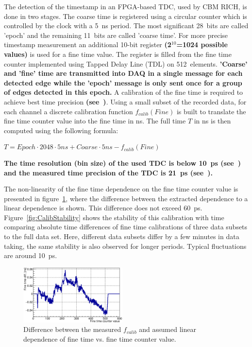 \documentclass[final,5p,times,twocolumn]{elsarticle}
\begin{document}
The detection of the timestamp in an FPGA-based TDC, used by CBM RICH, is done in two stages. The coarse time is registered using a circular counter which is controlled by the clock with a 5~ns period. The most significant 28~bits are called 'epoch' and the remaining 11~bits are called 'coarse time'. For more precise timestamp measurement an additional 10-bit register \textbf{(2$^{10}$=1024 possible values)} is used for a fine time value. The register is filled from the fine time counter implemented using Tapped Delay Line (TDL) on 512~elements.
\textbf{'Coarse' and 'fine' time are transmitted into DAQ in a single message for each detected edge while the 'epoch' message is only sent once for a group of edges detected in this epoch.}
A calibration of the fine time is required to achieve best time precision \textbf{(see~\cite{FINECALIB})}. Using a small subset of the recorded data, for each channel a discrete calibration function $ f_{calib}(Fine) $ is built to translate the fine time counter value into the fine time in ns. The full time $ T $ in ns is then computed using the following formula:

{\centering
$ T = Epoch \cdot 2048 \cdot 5ns + Coarse \cdot 5ns - f_{calib}(Fine) $ \\
}

\textbf{The time resolution (bin size) of the used TDC is below 10~ps (see~\cite{TDC}) and the measured time precision of the TDC is 21~ps (see~\cite{PEPAN}).}

The non-linearity of the fine time dependence on the fine time counter value is presented in figure~\ref{fig:CalibTableMinusLinear}, where the difference between the extracted dependence to a linear dependence is shown. This difference does not exceed 60~ps. Figure~\ref{fig:CalibStability} shows the stability of this calibration with time comparing absolute time differences of fine time calibrations of three data subsets to the full data set. Here, different data subsets differ by a few minutes in data taking, the same stability is also observed for longer periods. Typical fluctuations are around 10~ps.

\begin{figure}[h]
	\centering
	\includegraphics[width=0.48\textwidth]{figures/CalTableMinusFit_0010_01_feb2017.eps}
	\caption{Difference between the measured $ f_{calib} $ and assumed linear dependence of fine time vs. fine time counter value.}
	\label{fig:CalibTableMinusLinear}
\end{figure}
\end{document}
